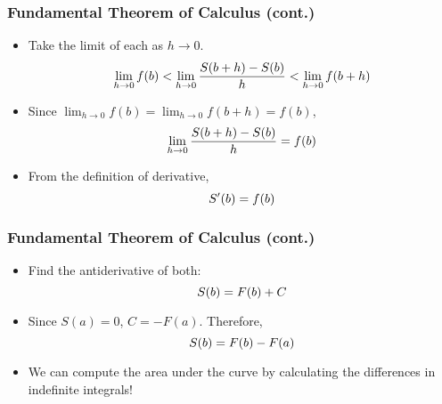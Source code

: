 \documentclass[pdflatex, 12pt]{beamer}
\begin{document}
\begin{frame}
\frametitle{Fundamental Theorem of Calculus (cont.)}
\begin{itemize}
\item Take the limit of each as $h \to 0$.
 \begin{equation}
 \lim_{h \to 0} f(b) < \lim_{h \to 0} \frac{S(b + h) - S(b)}{h} < \lim_{h \to 0} f(b + h) \notag
 \end{equation}
\vspace{0.1cm}
\item Since $\lim_{h \to 0} f(b) = \lim_{h \to 0} f(b + h) = f(b)$, 
 \begin{equation}
 \lim_{h \to 0} \frac{S(b + h) - S(b)}{h} = f(b) \notag
 \end{equation}
\vspace{0.1cm}
\item From the definition of derivative, 
 \begin{equation}
 S'(b) = f(b) \notag
 \end{equation}
\end{itemize}
\end{frame}

\begin{frame}
\frametitle{Fundamental Theorem of Calculus (cont.)}
\begin{itemize}
\item Find the antiderivative of both:
 \begin{equation}
 S(b) = F(b) + C \notag
 \end{equation}
\vspace{0.1cm}
\item Since $S(a) = 0$, $C = -F(a)$. Therefore,
 \begin{equation}
 S(b) = F(b) - F(a) \notag
 \end{equation}
\vspace{0.1cm}
\item We can compute the area under the curve by calculating the differences in indefinite integrals!
\end{itemize}
\end{frame}
\end{document}
